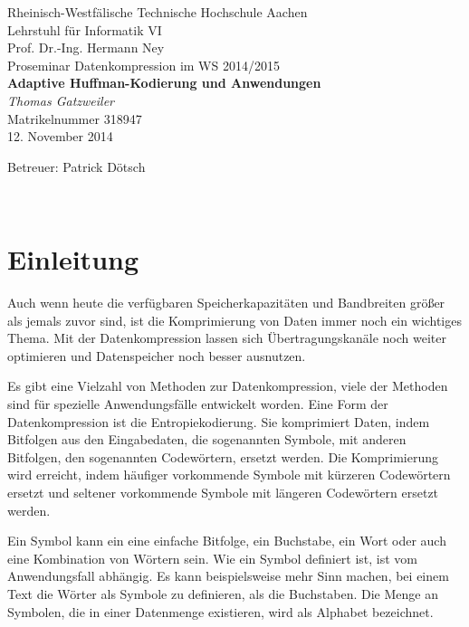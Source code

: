 \documentclass[twoside,11pt,a4paper]{article}
\theoremstyle{break}
\begin{document}

\pagestyle{empty}
\begin{center}
    Rheinisch-Westfälische Technische Hochschule Aachen \\
    Lehrstuhl für Informatik VI \\
    Prof. Dr.-Ing. Hermann Ney\\[6ex]
    Proseminar Datenkompression im WS 2014/2015\\[12ex]

    \LARGE
    \textbf{Adaptive Huffman-Kodierung und Anwendungen} \\[6ex]
    \textit{Thomas Gatzweiler} \\[6ex]
    \Large
    Matrikelnummer 318947 \\[6ex]
    12. November 2014

    \vfill
    \Large Betreuer: Patrick Dötsch
\end{center}

\newpage
\
\newpage

\pagestyle{headings}
\tableofcontents
\listoftables
\listoffigures
\newpage
\pagestyle{empty}
\newpage
\pagestyle{headings}


\newcommand{\sectionbreak}{\clearpage}

\nocite{*}

\section{Einleitung}
Auch wenn heute die verfügbaren Speicherkapazitäten und Bandbreiten
größer als jemals zuvor sind, ist die Komprimierung von Daten immer
noch ein wichtiges Thema. Mit der Datenkompression lassen sich
Übertragungskanäle noch weiter optimieren und Datenspeicher noch
besser ausnutzen.

Es gibt eine Vielzahl von Methoden zur Datenkompression, viele der
Methoden sind für spezielle Anwendungsfälle entwickelt worden. Eine
Form der Datenkompression ist die Entropiekodierung. Sie komprimiert
Daten, indem Bitfolgen aus den Eingabedaten, die sogenannten Symbole,
mit anderen Bitfolgen, den sogenannten Codewörtern, ersetzt
werden. Die Komprimierung wird erreicht, indem häufiger vorkommende
Symbole mit kürzeren Codewörtern ersetzt und seltener vorkommende
Symbole mit längeren Codewörtern ersetzt werden.

Ein Symbol kann ein eine einfache Bitfolge, ein Buchstabe, ein Wort
oder auch eine Kombination von Wörtern sein. Wie ein Symbol definiert
ist, ist vom Anwendungsfall abhängig. Es kann beispielsweise mehr Sinn
machen, bei einem Text die Wörter als Symbole zu definieren, als die
Buchstaben. Die Menge an Symbolen, die in einer Datenmenge existieren,
wird als Alphabet bezeichnet.
\end{document}

